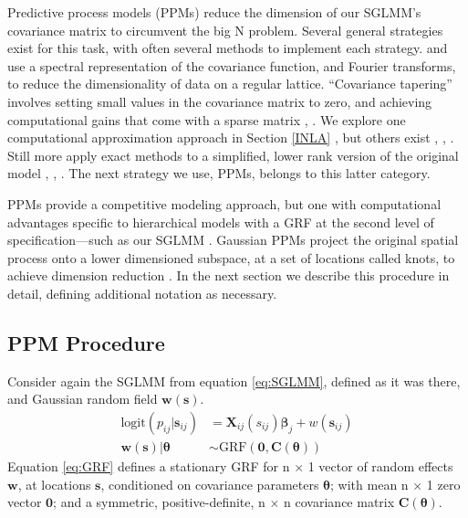 Predictive process models (PPMs) reduce the dimension of our SGLMM's covariance matrix to circumvent the big N problem. Several general strategies exist for this task, with often several methods to implement each strategy. \cite{Fuentes2007} and \cite{Paciorek2007} use a spectral representation of the covariance function, and Fourier transforms, to reduce the dimensionality of data on a regular lattice. ``Covariance tapering'' involves setting small values in the covariance matrix to zero, and achieving computational gains that come with a sparse matrix \citep{Furrer2006}, \citep{Kaufman2008}. We explore one computational approximation approach in Section \ref{INLA} \citep{Rue2009}, but others exist \citep{Stein2004}, \citep{Eidsvik2014}, \citep{Aune2014}. Still more apply exact methods to a simplified, lower rank version of the original model \citep{Cressie2008}, \citep{Higdon2002}, \citep{Eidsvik2012}. The next strategy we use, PPMs, belongs to this latter category.

PPMs provide a competitive modeling approach, but one with computational advantages specific to hierarchical models with a GRF at the second level of specification---such as our SGLMM \citep{Banerjee2008}. Gaussian PPMs project the original spatial process onto a lower dimensioned subspace, at a set of locations called knots, to achieve dimension reduction \citep{Banerjee2008}. In the next section we describe this procedure in detail, defining additional notation as necessary.

\subsection{PPM Procedure}
Consider again the SGLMM from equation \ref{eq:SGLMM}, defined as it was there, and Gaussian random field $\pmb{w}(\pmb{s})$.
\begin{align}
\text{logit}(p_{ij}|\pmb{s}_{ij}) &= \pmb{X}_{ij}(s_{ij}) \pmb{\beta}_{j} + w(\pmb{s}_{ij}) \label{eq:ppm} \\
\pmb{w}(\pmb{s}) | \pmb{\theta} &\sim \text{GRF}(\pmb{0}, \pmb{C}(\pmb{\theta})) \label{eq:GRF}
\end{align}
Equation \ref{eq:GRF} defines a stationary GRF for n $\times$ 1 vector of random effects $\pmb{w}$, at locations $\pmb{s}$, conditioned on covariance parameters $\pmb{\theta}$; with mean  n $\times$ 1 zero vector $\pmb{0}$; and a symmetric, positive-definite, n $\times$ n covariance matrix $\pmb{C}(\pmb{\theta})$.

